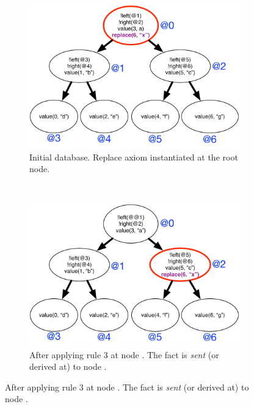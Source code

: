 \begin{figure}[h]
        \centering
        \begin{subfigure}[b]{0.5\textwidth}
                \includegraphics[width=\textwidth]{figures/btree/btree_trace1}
                \caption{Initial database. Replace axiom instantiated at the
                    root node.}
                \label{fig:language:btree_trace1}
        \end{subfigure}%
        ~
        \begin{subfigure}[b]{0.5\textwidth}
                \includegraphics[width=\textwidth]{figures/btree/btree_trace2}

                \caption{After applying rule 3 at node . The
                 fact is \emph{sent} (or derived at) to node
                .}


\end{subfigure}
\end{figure}
